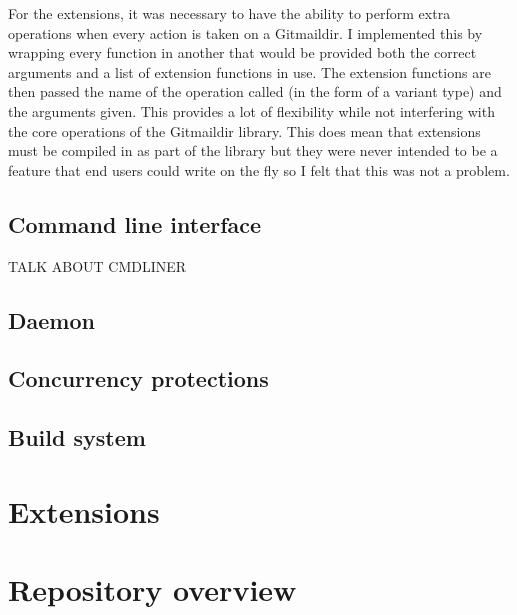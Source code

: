 For the extensions, it was necessary to have the ability to perform extra operations when every action is taken on a Gitmaildir. I implemented this by wrapping every function in another that would be provided both the correct arguments and a list of extension functions in use. The extension functions are then passed the name of the operation called (in the form of a variant type) and the arguments given. This provides a lot of flexibility while not interfering with the core operations of the Gitmaildir library. This does mean that extensions must be compiled in as part of the library but they were never intended to be a feature that end users could write on the fly so I felt that this was not a problem.

\subsection{Command line interface}

TALK ABOUT CMDLINER


\subsection{Daemon}

\subsection{Concurrency protections} \label{section:concurrency}

\subsection{Build system}

\section{Extensions} \label{section:extensions}

\section{Repository overview}
